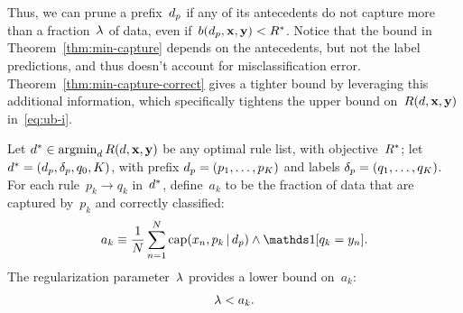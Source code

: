 Thus, we can prune a prefix~$d_p$ if any of its antecedents do not capture
more than a fraction~${\lambda}$ of data, even if~${b(d_p, \mathbf{x}, \mathbf{y}) < R^*}$.
%
Notice that the bound in Theorem~\ref{thm:min-capture}
depends on the antecedents, but not the label predictions,
and thus doesn't account for misclassification error.
%
Theorem~\ref{thm:min-capture-correct} gives a tighter bound
by leveraging this additional information, which specifically
tightens the upper bound on~$R({d}, \mathbf{x}, \mathbf{y})$ in~\eqref{eq:ub-i}.

\begin{theorem}
\label{thm:min-capture-correct}
Let ${d^* \in \operatorname*{argmin}_{d} R({d}, \mathbf{x}, \mathbf{y})}$
be any optimal rule list, with objective~$R^*$;
let ${d^* = (d_p, \delta_p, q_0, K)}$,
with prefix ${d_p = (p_1, \dots, p_K)}$
and labels ${\delta_p = (q_1, \dots, q_K)}$.
%
For each rule~${p_k \rightarrow q_k}$ in~$d^*$,
define~$a_k$ to be the fraction of data that are captured by~$p_k$
and correctly classified:
\begin{align}
a_k \equiv \frac{1}{N} \sum_{n=1}^N
  \Cap(x_n, p_k \given \Prefix) \wedge \one [ q_k = y_n ].
\label{eq:rule-correct}
\end{align}
The regularization parameter~${\lambda}$ provides a lower bound on~$a_k$:
\begin{align}
\Reg < a_k.
\label{eq:min-capture-correct}
\end{align}
\end{theorem}

